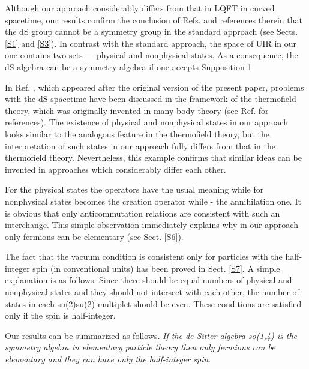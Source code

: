 \documentclass[a4paper,12pt]{article}%
\begin{document}
\begin{sloppypar}
Although our approach considerably differs from that
in LQFT in curved spacetime, our results confirm the 
conclusion of Refs. \cite{Narlikar,Susskind} and references
therein that the dS group cannot be a symmetry group
in the standard approach (see Sects. \ref{S1} and 
\ref{S3}). In contrast with the standard approach, 
the space of UIR
in our one contains two sets --- physical and 
nonphysical states. As a consequence, the dS algebra
can be a symmetry algebra if one accepts Supposition 1. 
\end{sloppypar}

In Ref. \cite{Susskind}, which appeared after the
original version of the present paper, problems with
the dS spacetime have been discussed in the framework of
the thermofield theory, which was originally invented
in many-body theory (see Ref. \cite{Susskind} for
references). The existence of physical and nonphysical
states in our approach looks similar to the analogous 
feature in the thermofield theory, but the
interpretation of such states in our approach fully
differs from that in the thermofield theory.
Nevertheless, this example confirms that similar 
ideas can be invented in approaches which considerably
differ each other.  

For the physical states the 
operators \coordHE{} have the usual meaning while for 
nonphysical states \coordHE{} becomes the creation operator while 
\coordHE{} - the annihilation one. It is obvious that only
anticommutation relations are consistent with such an 
interchange. This simple observation immediately explains why 
in our approach only fermions can 
be elementary (see Sect. \ref{S6}). 

The fact that the vacuum condition is consistent only for 
particles with the half-integer spin (in conventional units) 
has been proved in Sect. \ref{S7}. A simple explanation is 
as follows. Since there should be equal numbers of physical 
and nonphysical states and they should not intersect with 
each other, the number of states in each su(2)\myHighlight{$\times$}\coordHE{}su(2) 
multiplet should be even. These conditions are satisfied 
only if the spin is half-integer.

Our results can be summarized as follows. {\it If the de 
Sitter algebra so(1,4) is the symmetry algebra in elementary 
particle theory then only fermions can be elementary and 
they can have only the half-integer spin}.
\end{document}
